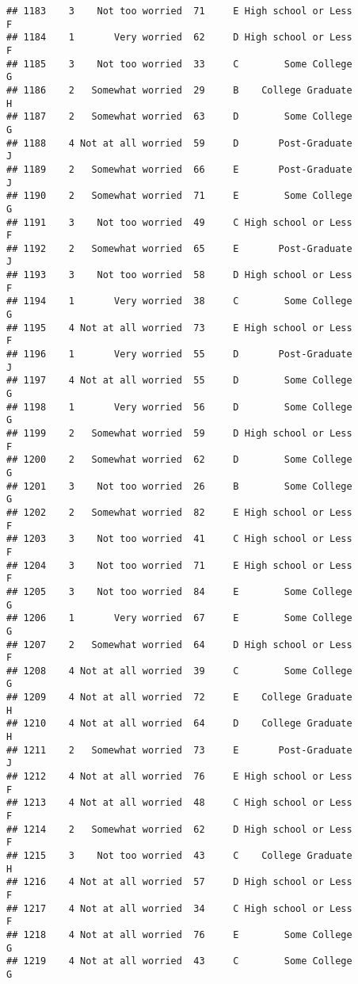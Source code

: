 \documentclass[
]{article}
\begin{document}
\begin{verbatim}
## 1183    3    Not too worried  71     E High school or Less         F
## 1184    1       Very worried  62     D High school or Less         F
## 1185    3    Not too worried  33     C        Some College         G
## 1186    2   Somewhat worried  29     B    College Graduate         H
## 1187    2   Somewhat worried  63     D        Some College         G
## 1188    4 Not at all worried  59     D       Post-Graduate         J
## 1189    2   Somewhat worried  66     E       Post-Graduate         J
## 1190    2   Somewhat worried  71     E        Some College         G
## 1191    3    Not too worried  49     C High school or Less         F
## 1192    2   Somewhat worried  65     E       Post-Graduate         J
## 1193    3    Not too worried  58     D High school or Less         F
## 1194    1       Very worried  38     C        Some College         G
## 1195    4 Not at all worried  73     E High school or Less         F
## 1196    1       Very worried  55     D       Post-Graduate         J
## 1197    4 Not at all worried  55     D        Some College         G
## 1198    1       Very worried  56     D        Some College         G
## 1199    2   Somewhat worried  59     D High school or Less         F
## 1200    2   Somewhat worried  62     D        Some College         G
## 1201    3    Not too worried  26     B        Some College         G
## 1202    2   Somewhat worried  82     E High school or Less         F
## 1203    3    Not too worried  41     C High school or Less         F
## 1204    3    Not too worried  71     E High school or Less         F
## 1205    3    Not too worried  84     E        Some College         G
## 1206    1       Very worried  67     E        Some College         G
## 1207    2   Somewhat worried  64     D High school or Less         F
## 1208    4 Not at all worried  39     C        Some College         G
## 1209    4 Not at all worried  72     E    College Graduate         H
## 1210    4 Not at all worried  64     D    College Graduate         H
## 1211    2   Somewhat worried  73     E       Post-Graduate         J
## 1212    4 Not at all worried  76     E High school or Less         F
## 1213    4 Not at all worried  48     C High school or Less         F
## 1214    2   Somewhat worried  62     D High school or Less         F
## 1215    3    Not too worried  43     C    College Graduate         H
## 1216    4 Not at all worried  57     D High school or Less         F
## 1217    4 Not at all worried  34     C High school or Less         F
## 1218    4 Not at all worried  76     E        Some College         G
## 1219    4 Not at all worried  43     C        Some College         G

\end{verbatim}
\end{document}

